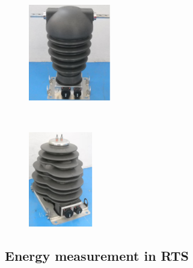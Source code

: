 	\begin{figure}[h!]
		\centering
		\begin{minipage}{0.45\textwidth}
			\centering
			\includegraphics[width=0.32\textwidth,keepaspectratio]{figures/32.EnergyS/current_t}
			\label{fig:current_t}
		\end{minipage}%
		\begin{minipage}{0.05\textwidth}  ~\end{minipage}	
		\begin{minipage}{0.45\textwidth}
			\centering
			\includegraphics[width=0.25\textwidth,keepaspectratio]{figures/32.EnergyS/voltage_t}
			
			
			\label{fig:voltage_t}
		\end{minipage}
	\end{figure}
	
\subsection{Energy measurement in RTS}	
\label{subs:323}


